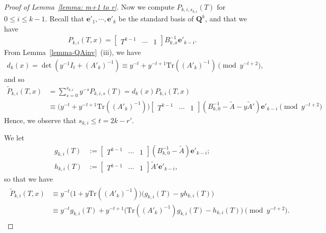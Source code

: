\documentclass[10pt,a4paper]{amsart}
\newcommand{\Q}{\mathbf{Q}}
\newcommand{\Tr}{\mathrm{Tr}}
\begin{document}
\begin{proof}[Proof of Lemma~\ref{lemma: m+1 to r}]
Now we compute $P_{k,i,s_{k,i}}(T)$ for $0\leq i\leq k-1$. Recall that $\mathbf{e}'_1,\cdots,\mathbf{e}'_k$ be the standard basis of $\Q^k$, and that we have
    \begin{align*}
        P_{k,i}(T,x)
        =
        \begin{bmatrix}
            T^{k-1} & \cdots & 1
        \end{bmatrix}
        B_{k,x}^{-1}\mathbf{e}'_{k-i}.
    \end{align*}
From Lemma~\ref{lemma-QAinv}~(iii), we have
    \begin{align*}
        d_k(x)
       =\det(y^{-1}I_t+(A'_k)^{-1})
       \equiv
        y^{-t}+y^{-t+1}\Tr((A'_k)^{-1})
        \pmod{y^{-t+2}},
    \end{align*}
and so
    \begin{align*}
        \tilde P_{k,i}(T,x)
        &=
        \sum_{s=0}^{s_{k,i}}y^{-s} P_{k,i,s}(T)
        =d_k(x)P_{k,i}(T,x)
        \\&\equiv
        \big(y^{-t}+y^{-t+1}\Tr((A'_k)^{-1})\big)
        \begin{bmatrix}
            T^{k-1} & \cdots & 1
        \end{bmatrix}
        (B_{k,0}^{-1}-\tilde A-y\tilde A')
        \mathbf{e}'_{k-i}\pmod{y^{-t+2}}
    \end{align*}
Hence, we observe that $s_{k,i}\leq t=2k-r'$.


We let
    \begin{align*}
        g_{k,i}(T)
        &:=
        \begin{bmatrix}
            T^{k-1} & \cdots & 1
        \end{bmatrix}
        (B_{k,0}^{-1}-\tilde A)
        \mathbf{e}'_{k-i};
        \\
        h_{k,i}(T)
        &:=
        \begin{bmatrix}
            T^{k-1} & \cdots & 1
        \end{bmatrix}
        \tilde A'
        \mathbf{e}'_{k-i},
    \end{align*}
so that we have
    \begin{align}\label{eq: tilde P_k,i}
    \begin{split}
        \tilde P_{k,i}(T,x)
        &\equiv
        y^{-t}\big(1+y\Tr((A'_k)^{-1})\big)
        \big(g_{k,i}(T)-yh_{k,i}(T)\big)
        \\
        &\equiv
        y^{-t}
        g_{k,i}(T)
        +
        y^{-t+1}
        \big(
        \Tr((A'_k)^{-1})g_{k,i}(T)
        -h_{k,i}(T)
        \big)\pmod{y^{-t+2}}.
    \end{split}
    \end{align}



\end{proof}
\end{document}
